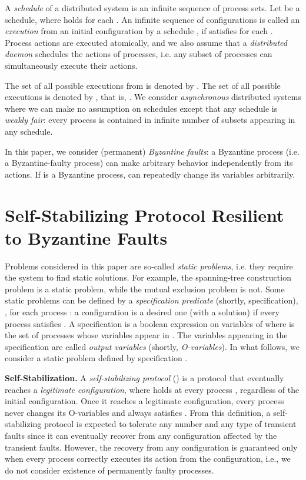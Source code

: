 \documentclass[11pt]{article}
\begin{document}
A \emph{schedule} of a distributed system is an infinite sequence of
process sets.  Let   be a schedule,
where  holds for each .
An infinite sequence of configurations
 is called an \emph{execution} from
an initial configuration  by a schedule ,
if  satisfies 
for each .
Process actions are executed atomically, and we also assume
that a \emph{distributed daemon} schedules the actions of processes,
i.e. any subset of processes can simultaneously execute
their actions.

The set of all possible executions from
 is denoted by .
The set of all possible executions is denoted by , that is,
.
We consider \emph{asynchronous} distributed systems
where we can make no assumption
on schedules except that any schedule is \emph{weakly fair}:
every process is contained in infinite number of subsets
appearing in any schedule.

In this paper, we consider (permanent) \emph{Byzantine faults}:
a Byzantine process (i.e. a Byzantine-faulty process)
can make arbitrary behavior independently from its actions.
If  is a Byzantine process,
 can repeatedly change its variables arbitrarily.

\section{Self-Stabilizing Protocol Resilient to Byzantine Faults}\label{sec:stab}

Problems considered in this paper are so-called \emph{static problems}, 
i.e. they require the system to find static solutions.
For example, the spanning-tree construction problem is a static problem,
while the mutual exclusion problem is not.
Some static problems can be defined by a \emph{specification predicate}
(shortly, specification), , for each process :
a configuration is a desired one (with a solution) if 
every process satisfies .
A specification  is a boolean expression
on variables of  where  is the set of processes
whose variables appear in .
The variables appearing in the specification are
called \emph{output variables} (shortly, \emph{O-variables}).
In what follows, we consider a static problem defined by
specification .

\noindent\textbf{Self-Stabilization.} A \emph{self-stabilizing protocol} (\cite{D74j}) is a protocol
that eventually reaches a \emph{legitimate configuration},
where  holds at every process , regardless of the initial configuration.
Once it reaches a legitimate configuration, every process never
changes its O-variables and always satisfies .
 From this definition, a self-stabilizing protocol is expected to tolerate 
any number and any type of transient faults since it can eventually 
recover from any configuration affected by the transient faults.
However, the recovery from any configuration is guaranteed
only when every process correctly executes its action from 
the configuration, i.e., we do not consider existence of
permanently faulty processes.
\end{document}
